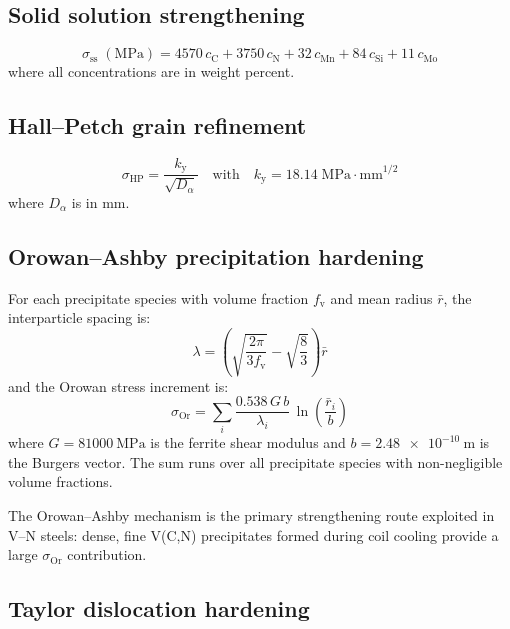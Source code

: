 \documentclass[11pt,a4paper]{article}
\newcommand{\fv}{\ensuremath{f_\mathrm{v}}}
\begin{document}
\subsection{Solid solution strengthening}

\begin{equation}
  \sigma_\mathrm{ss}\;(\mathrm{MPa})
    = 4570\,c_\mathrm{C} + 3750\,c_\mathrm{N}
    + 32\,c_\mathrm{Mn} + 84\,c_\mathrm{Si} + 11\,c_\mathrm{Mo}
  \label{eq:ss}
\end{equation}
where all concentrations are in weight percent.

\subsection{Hall--Petch grain refinement}

\begin{equation}
  \sigma_\mathrm{HP} = \frac{k_\mathrm{y}}{\sqrt{D_\alpha}}
    \quad\text{with}\quad k_\mathrm{y}
    = 18.14\;\mathrm{MPa\!\cdot\!mm}^{1/2}
  \label{eq:hp}
\end{equation}
where $D_\alpha$ is in mm.

\subsection{Orowan--Ashby precipitation hardening}

For each precipitate species with volume fraction $\fv$ and mean radius
$\bar{r}$, the interparticle spacing is:
\begin{equation}
  \lambda = \left(\sqrt{\frac{2\pi}{3\fv}}
    - \sqrt{\frac{8}{3}}\right)\bar{r}
  \label{eq:lambda}
\end{equation}
and the Orowan stress increment is:
\begin{equation}
  \sigma_\mathrm{Or} = \sum_i
    \frac{0.538\,G\,b}{\lambda_i}\,\ln\!\left(\frac{\bar{r}_i}{b}\right)
  \label{eq:orowan}
\end{equation}
where $G = \SI{81000}{\mega\pascal}$ is the ferrite shear modulus and
$b = \SI{2.48e-10}{\metre}$ is the Burgers vector.  The sum runs over all
precipitate species with non-negligible volume fractions.

The Orowan--Ashby mechanism is the primary strengthening route exploited in
V--N steels: dense, fine V(C,N) precipitates formed during coil cooling
provide a large $\sigma_\mathrm{Or}$ contribution.

\subsection{Taylor dislocation hardening}
\end{document}
